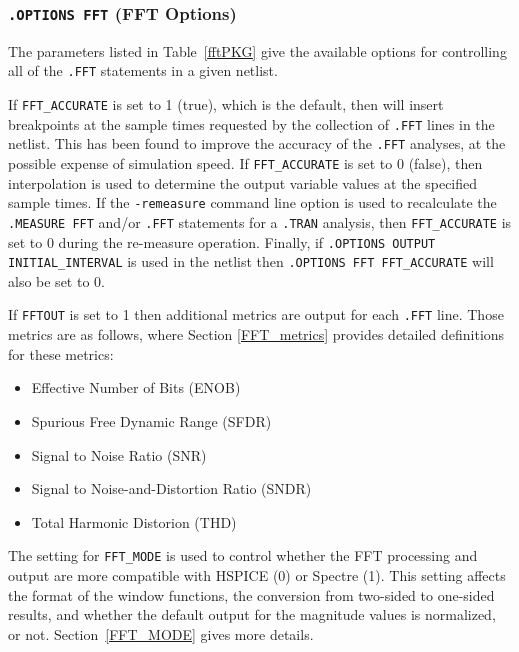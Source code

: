 

\subsubsection{\texttt{.OPTIONS FFT} (FFT Options)}
The parameters listed in Table~\ref{fftPKG} give the available
options for controlling all of the \texttt{.FFT} statements in
a given \Xyce{} netlist.

If \texttt{FFT\_ACCURATE} is set to 1 (true), which is the default, then
\Xyce{} will insert breakpoints at the sample times requested by the
collection of \texttt{.FFT} lines in the netlist.  This has been found
to improve the accuracy of the \texttt{.FFT} analyses, at the possible
expense of simulation speed.  If \texttt{FFT\_ACCURATE} is set to
0 (false), then interpolation is used to determine the output variable
values at the specified sample times.  If the \texttt{-remeasure} command
line option is used to recalculate the \texttt{.MEASURE FFT} and/or
\texttt{.FFT} statements for a \texttt{.TRAN} analysis, then
\texttt{FFT\_ACCURATE} is set to 0 during the re-measure operation.  Finally,
if \texttt{.OPTIONS OUTPUT INITIAL\_INTERVAL} is used in the netlist
then \texttt{.OPTIONS FFT FFT\_ACCURATE} will also be set to 0.

If \texttt{FFTOUT} is set to 1 then additional metrics are output for each
\texttt{.FFT} line.  Those metrics are as follows, where Section \ref{FFT_metrics}
provides detailed definitions for these metrics:

\begin{itemize}
  \item Effective Number of Bits (ENOB)
  \item Spurious Free Dynamic Range (SFDR)
  \item Signal to Noise Ratio (SNR)
  \item Signal to Noise-and-Distortion Ratio (SNDR)
  \item Total Harmonic Distorion (THD)
\end{itemize}

The setting for \texttt{FFT\_MODE} is used to control whether the \Xyce{} FFT
processing and output are more compatible with HSPICE (0) or Spectre (1).
This setting affects the format of the window functions, the conversion from
two-sided to one-sided results, and whether the default output for the
magnitude values is normalized, or not.  Section~\ref{FFT_MODE} gives
more details.

